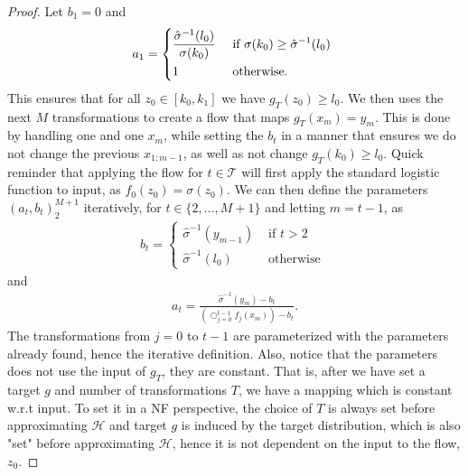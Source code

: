 \begin{proof}
    Let \(b_1 = 0\) and
    \begin{align*}
        a_1 =
        \begin{dcases}
            \frac{\hat{\sigma}^{-1}(l_0)}{\sigma(k_0)} & \text{ if \(\sigma(k_0) \geq \hat{\sigma}^{-1}(l_0)\) }\\
            1 & \text{ otherwise. }
        \end{dcases}
    \end{align*}
    This ensures that for all \(z_0 \in [k_0, k_1]\) we have \(g_T(z_0) \geq l_0\).
    We then uses the next \(M\) transformations to create a flow that maps \(g_T(x_m)=y_m\). This is done by handling one
    and one \(x_m\), while setting the \(b_t\) in a manner that ensures we do not change the previous \(x_{1:m-1}\), as well as
    not change \(g_T(k_0) \geq l_0\). Quick reminder that applying the flow for \(t \in \mathcal{T}\) will first apply the standard logistic function to 
    input, as \(f_0(z_0) = \sigma(z_0)\). We can then define the parameters \((a_t,b_t)^{M+1}_2\) iteratively, for \(t \in \{2,\dots,M+1\}\) and 
    letting \(m=t-1\), as 
    \begin{align*}
        b_t =
        \begin{cases}
            \hat{\sigma}^{-1}(y_{m-1}) & \text{ if \(t > 2\) } \\
            \hat{\sigma}^{-1}(l_0) & \text{ otherwise }
        \end{cases}
    \end{align*}
    and
    \begin{align*}
        a_t = \frac{\hat{\sigma}^{-1}(y_m) - b_t}{\left(\bigcirc_{j=0}^{t-1} f_j(x_m)\right) - b_t}.
    \end{align*}
    The transformations from \(j=0\) to \(t-1\) are parameterized with the parameters already found, hence the iterative definition.
    Also, notice that the parameters does not use the input of \(g_T\), they are constant. That is, after we have set a target \(g\) and 
    number of transformations \(T\), we have a mapping which is constant w.r.t input. To set it in a NF perspective, 
    the choice of \(T\) is always set before approximating \(\mathcal{H}\) and target \(g\) is induced by the target distribution, which
    is also "set" before approximating \(\mathcal{H}\), hence it is not dependent on the input to the flow, \(z_0\). 


\end{proof}
